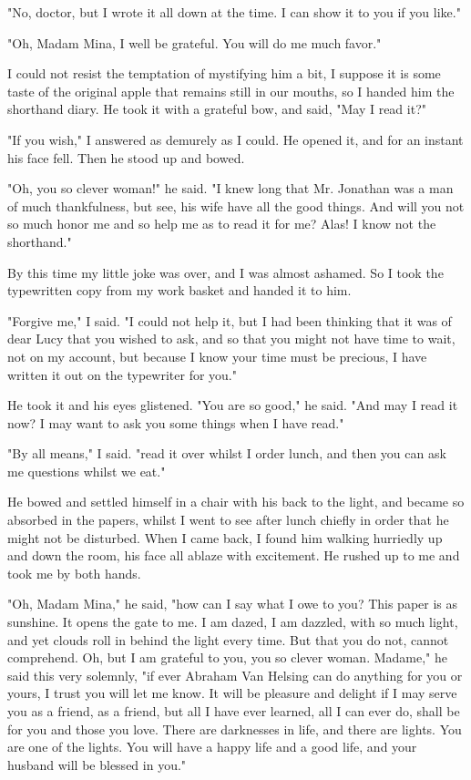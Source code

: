 "No, doctor, but I wrote it all down at the time. I can show it to you if you like." 

"Oh, Madam Mina, I well be grateful. You will do me much favor." 

I could not resist the temptation of mystifying him a bit, I suppose it is some taste of the original apple that remains still in our mouths, so I handed him the shorthand diary. He took it with a grateful bow, and said, "May I read it?" 

"If you wish," I answered as demurely as I could. He opened it, and for an instant his face fell. Then he stood up and bowed. 

"Oh, you so clever woman!" he said. "I knew long that Mr. Jonathan was a man of much thankfulness, but see, his wife have all the good things. And will you not so much honor me and so help me as to read it for me? Alas! I know not the shorthand." 

By this time my little joke was over, and I was almost ashamed. So I took the typewritten copy from my work basket and handed it to him. 

"Forgive me," I said. "I could not help it, but I had been thinking that it was of dear Lucy that you wished to ask, and so that you might not have time to wait, not on my account, but because I know your time must be precious, I have written it out on the typewriter for you." 

He took it and his eyes glistened. "You are so good," he said. "And may I read it now? I may want to ask you some things when I have read." 

"By all means," I said. "read it over whilst I order lunch, and then you can ask me questions whilst we eat." 

He bowed and settled himself in a chair with his back to the light, and became so absorbed in the papers, whilst I went to see after lunch chiefly in order that he might not be disturbed. When I came back, I found him walking hurriedly up and down the room, his face all ablaze with excitement. He rushed up to me and took me by both hands. 

"Oh, Madam Mina," he said, "how can I say what I owe to you? This paper is as sunshine. It opens the gate to me. I am dazed, I am dazzled, with so much light, and yet clouds roll in behind the light every time. But that you do not, cannot comprehend. Oh, but I am grateful to you, you so clever woman. Madame," he said this very solemnly, "if ever Abraham Van Helsing can do anything for you or yours, I trust you will let me know. It will be pleasure and delight if I may serve you as a friend, as a friend, but all I have ever learned, all I can ever do, shall be for you and those you love. There are darknesses in life, and there are lights. You are one of the lights. You will have a happy life and a good life, and your husband will be blessed in you." 

